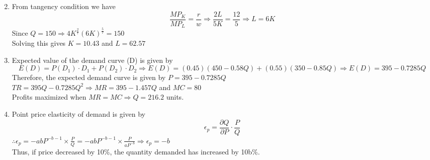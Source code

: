 \documentclass{article}
\begin{document}
\begin{enumerate}
\[        \]
    \item 
        From tangency condition we have 
        \[
        \frac{MP_K}{MP_L} = \frac{r}{w} \Rightarrow \frac{2L}{5K} = \frac{12}{5} \Rightarrow L=6K
        \]
        Since $Q=150 \Rightarrow 4K^\frac{2}{7}(6K)^\frac{5}{7}=150$\\
        Solving this gives $K=10.43$ and $L = 62.57$
    \item 
        Expected value of the demand curve (D) is given by
        \[
        E(D)=P(D_1)\cdot D_1 + P(D_2)\cdot D_2 \Rightarrow E(D) = (0.45)(450-0.58Q)+(0.55)(350-0.85Q) \Rightarrow E(D)=395-0.7285Q 
        \]
        Therefore, the expected demand curve is given by $P=395-0.7285Q$ \\
        $TR=395Q-0.7285Q^2 \Rightarrow MR=395-1.457Q$ and $MC=80$\\
        Profits maximized when $MR=MC \Rightarrow Q=216.2$ units.
    \item 
        Point price elasticity of demand is given by 
        \[
        \epsilon_p = \frac{\partial{Q}}{\partial{P}} \cdot \frac{P}{Q}
        \]
        $\therefore \epsilon_p = -abP^{-b-1}\times \frac{P}{Q} = -abP^{-b-1}\times \frac{P}{aP^{-b}} \Rightarrow \epsilon_p = -b$ \\
        Thus, if price decreased by 10\%, the quantity demanded has increased by 10b\%.
\end{enumerate}
\end{document}
